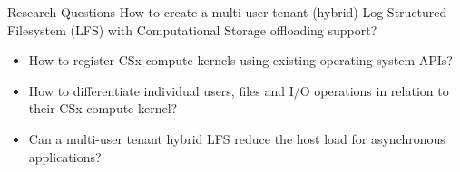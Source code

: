 \documentclass{beamer}
\begin{document}
\begin{frame}{Research Questions}
	\begingroup
	\small
		How to create a multi-user tenant (hybrid) Log-Structured Filesystem
		(LFS) with Computational Storage offloading support?
	\begin{itemize}
		\item How to register CSx compute kernels using existing operating 
			  system APIs?
  		\item How to differentiate individual users, files and I/O operations in
			  relation to their CSx compute kernel?
		\item Can a multi-user tenant hybrid LFS reduce the host load for
              asynchronous applications?
	\end{itemize}
	\endgroup
\end{frame}
\end{document}
